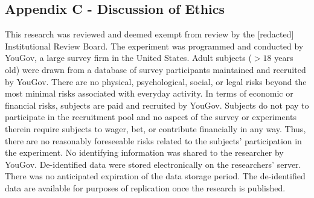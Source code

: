 \documentclass[12pt]{article}%
\begin{document}
\begin{doublespace}
\clearpage
\section*{Appendix C - Discussion of Ethics}

This research was reviewed and deemed exempt from review by the [redacted] Institutional Review Board. The experiment was programmed and conducted by YouGov, a large survey firm in the United States. Adult subjects ($>18$ years old) were drawn from a database of survey participants maintained and recruited by YouGov. There are no physical, psychological, social, or legal risks beyond the most minimal risks associated with everyday activity. In terms of economic or financial risks, subjects are paid and recruited by YouGov. Subjects do not pay to participate in the recruitment pool and no aspect of the survey or experiments therein require subjects to wager, bet, or contribute financially in any way. Thus, there are no reasonably foreseeable risks related to the subjects' participation in the experiment. No identifying information was shared to the researcher by YouGov. De-identified data were stored electronically on the researchers' server. There was no anticipated expiration of the data storage period. The de-identified data are available for purposes of replication once the research is published.





\end{doublespace}
\end{document}
